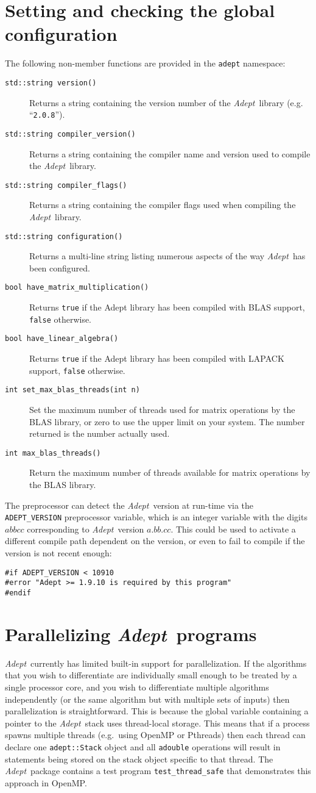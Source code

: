 \documentclass[a4,oneside]{book}
\def\codesize{\small}
\def\Adept{\emph{Adept}}
\def\code#1{{\codesize\texttt{#1}}}
\def\citem#1{\item[{\codesize\texttt{#1}}]}
\begin{document}
\section{Setting and checking the global configuration}
\label{sec:settings}
\noindent The following non-member functions are provided in the
\code{adept} namespace:
\begin{description}
\citem{std::string version()} Returns a string containing the version
number of the \Adept\ library (e.g. ``\code{2.0.8}'').
\citem{std::string compiler\_version()} Returns a string containing
the compiler name and version used to compile the \Adept\ library.
\citem{std::string compiler\_flags()} Returns a string containing the
compiler flags used when compiling the \Adept\ library.
\citem{std::string configuration()} Returns a multi-line string
listing numerous aspects of the way \Adept\ has been configured.
\citem{bool have\_matrix\_multiplication()} Returns \code{true} if the
Adept library has been compiled with BLAS support, \code{false}
otherwise.
\citem{bool have\_linear\_algebra()} Returns \code{true} if the
Adept library has been compiled with LAPACK support, \code{false}
otherwise.
\citem{int set\_max\_blas\_threads(int n)} Set the maximum number of
threads used for matrix operations by the BLAS library, or zero to use
the upper limit on your system. The number returned is the number
actually used.  
\citem{int max\_blas\_threads()} Return the maximum number of
threads available for matrix operations by the BLAS library.
%
\end{description}

The preprocessor can detect the \Adept\ version at run-time via the
\code{ADEPT\_VERSION} preprocessor variable, which is an integer
variable with the digits $abbcc$ corresponding to \Adept\ version
$a.bb.cc$. This could be used to activate a different compile path
dependent on the version, or even to fail to compile if the version is
not recent enough:
\begin{lstlisting}
#if ADEPT_VERSION < 10910
#error "Adept >= 1.9.10 is required by this program"
#endif
\end{lstlisting}

\section{Parallelizing \Adept\ programs}
\Adept\ currently has limited built-in support for parallelization. If
the algorithms that you wish to differentiate are individually small
enough to be treated by a single processor core, and you wish to
differentiate multiple algorithms independently (or the same algorithm
but with multiple sets of inputs) then parallelization is
straightforward. This is because the global variable containing a
pointer to the \Adept\ stack uses thread-local storage.  This means
that if a process spawns multiple threads (e.g.\ using OpenMP or
Pthreads) then each thread can declare one \code{adept::Stack} object
and all \code{adouble} operations will result in statements being
stored on the stack object specific to that thread.  The
\Adept\ package contains a test program \code{test\_thread\_safe} that
demonstrates this approach in OpenMP.
\end{document}
